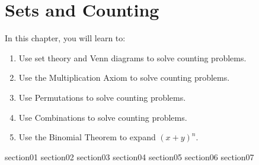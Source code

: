 \chapter{Sets and Counting}\label{chapter_sets_and_counting}

In this chapter, you will learn to:
\begin{enumerate}
    \item Use set theory and Venn diagrams to solve counting problems.
    \item Use the Multiplication Axiom to solve counting problems.
    \item Use Permutations to solve counting problems.
    \item Use Combinations to solve counting problems.
    \item Use the Binomial Theorem to expand $(x + y)^n$.
\end{enumerate}

{section01}
{section02}
{section03}
{section04}
{section05}
{section06}
{section07}